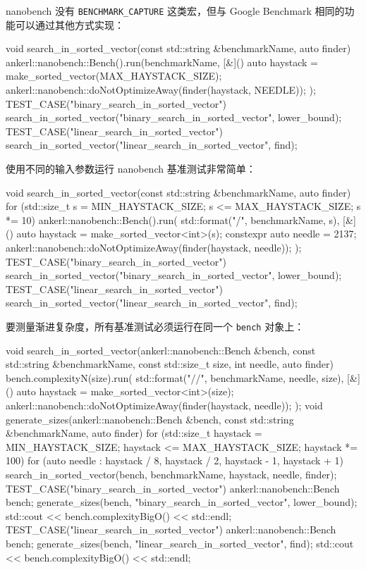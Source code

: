nanobench 没有 \texttt{BENCHMARK\_\allowbreak{}CAPTURE} 这类宏，但与 Google Benchmark 相同的功能可以通过其他方式实现：

\begin{codebox}[cpp]
void search_in_sorted_vector(const std::string &benchmarkName, auto finder){
    ankerl::nanobench::Bench().run(benchmarkName, [&]() {
    auto haystack = make_sorted_vector(MAX_HAYSTACK_SIZE);
    ankerl::nanobench::doNotOptimizeAway(finder(haystack, NEEDLE));
  });
}
TEST_CASE("binary_search_in_sorted_vector") {
  search_in_sorted_vector("binary_search_in_sorted_vector", lower_bound);
}
TEST_CASE("linear_search_in_sorted_vector") {
  search_in_sorted_vector("linear_search_in_sorted_vector", find);
}
\end{codebox}

\label{idx:1184}
使用不同的输入参数运行 nanobench 基准测试非常简单：

\begin{codebox}[cpp]
void search_in_sorted_vector(const std::string &benchmarkName, auto finder) {
  for (std::size_t s = MIN_HAYSTACK_SIZE; s <= MAX_HAYSTACK_SIZE; s *= 10) 
  {
          ankerl::nanobench::Bench().run(
          std::format("{}/{}", benchmarkName, s), [&]() {
          auto haystack = make_sorted_vector<int>(s);
          constexpr auto needle = 2137;
          ankerl::nanobench::doNotOptimizeAway(finder(haystack, needle));
        });
  }
}
TEST_CASE("binary_search_in_sorted_vector") {
  search_in_sorted_vector("binary_search_in_sorted_vector", lower_bound);
}
TEST_CASE("linear_search_in_sorted_vector") {
  search_in_sorted_vector("linear_search_in_sorted_vector", find);
}
\end{codebox}

\label{idx:1185}
要测量渐进复杂度，所有基准测试必须运行在同一个 \texttt{bench} 对象上：

\begin{codebox}[cpp]
void search_in_sorted_vector(ankerl::nanobench::Bench &bench,
                             const std::string &benchmarkName,
                             const std::size_t size, int needle, auto finder) {
        bench.complexityN(size).run(
        std::format("{}/{}/{}", benchmarkName, needle, size), [&]() {
        auto haystack = make_sorted_vector<int>(size);
        ankerl::nanobench::doNotOptimizeAway(finder(haystack, needle));
      });
}
void generate_sizes(ankerl::nanobench::Bench &bench,
                    const std::string &benchmarkName, auto finder) {
  for (std::size_t haystack = MIN_HAYSTACK_SIZE; haystack <= 
       MAX_HAYSTACK_SIZE; haystack *= 100) {
       for (auto needle :
         {haystack / 8, haystack / 2, haystack - 1, haystack + 1}) {
          search_in_sorted_vector(bench, benchmarkName, haystack, needle,
                                  finder);
         }
  }
}
TEST_CASE("binary_search_in_sorted_vector") {
  ankerl::nanobench::Bench bench;
  generate_sizes(bench, "binary_search_in_sorted_vector", lower_bound);
  std::cout << bench.complexityBigO() << std::endl;
}
TEST_CASE("linear_search_in_sorted_vector") {
  ankerl::nanobench::Bench bench;
  generate_sizes(bench, "linear_search_in_sorted_vector", find);
  std::cout << bench.complexityBigO() << std::endl;
}
\end{codebox}

